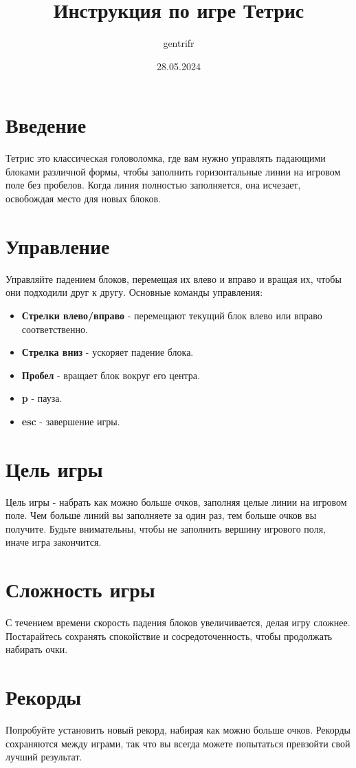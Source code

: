\documentclass[a4paper,12pt]{article}
\title{Инструкция по игре Тетрис}
\author{gentrifr}
\date{28.05.2024}
\begin{document}
\maketitle

\section{Введение}
Тетрис это классическая головоломка, где вам нужно управлять падающими блоками различной формы, чтобы заполнить горизонтальные линии на игровом поле без пробелов. Когда линия полностью заполняется, она исчезает, освобождая место для новых блоков.

\section{Управление}
Управляйте падением блоков, перемещая их влево и вправо и вращая их, чтобы они подходили друг к другу. Основные команды управления:

\begin{itemize}
    \item \textbf{Стрелки влево/вправо} - перемещают текущий блок влево или вправо соответственно.
    \item \textbf{Стрелка вниз} - ускоряет падение блока.
    \item \textbf{Пробел} - вращает блок вокруг его центра.
    \item \textbf{p} - пауза.
    \item \textbf{esc} - завершение игры.
\end{itemize}

\section{Цель игры}
Цель игры - набрать как можно больше очков, заполняя целые линии на игровом поле. Чем больше линий вы заполняете за один раз, тем больше очков вы получите. Будьте внимательны, чтобы не заполнить вершину игрового поля, иначе игра закончится.

\section{Сложность игры}
С течением времени скорость падения блоков увеличивается, делая игру сложнее. Постарайтесь сохранять спокойствие и сосредоточенность, чтобы продолжать набирать очки.

\section{Рекорды}
Попробуйте установить новый рекорд, набирая как можно больше очков. Рекорды сохраняются между играми, так что вы всегда можете попытаться превзойти свой лучший результат.
\end{document}
